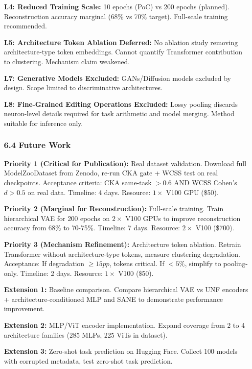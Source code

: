\textbf{L4: Reduced Training Scale:} 10 epochs (PoC) vs 200 epochs (planned). Reconstruction accuracy marginal (68\% vs 70\% target). Full-scale training recommended.

\textbf{L5: Architecture Token Ablation Deferred:} No ablation study removing architecture-type token embeddings. Cannot quantify Transformer contribution to clustering. Mechanism claim weakened.

\textbf{L7: Generative Models Excluded:} GANs/Diffusion models excluded by design. Scope limited to discriminative architectures.

\textbf{L8: Fine-Grained Editing Operations Excluded:} Lossy pooling discards neuron-level details required for task arithmetic and model merging. Method suitable for inference only.

\subsubsection{6.4 Future Work}

\textbf{Priority 1 (Critical for Publication):} Real dataset validation. Download full ModelZooDataset from Zenodo, re-run CKA gate + WCSS test on real checkpoints. Acceptance criteria: CKA same-task $> 0.6$ AND WCSS Cohen's $d > 0.5$ on real data. Timeline: 4 days. Resource: $1\times$ V100 GPU (\$50).

\textbf{Priority 2 (Marginal for Reconstruction):} Full-scale training. Train hierarchical VAE for 200 epochs on $2\times$ V100 GPUs to improve reconstruction accuracy from 68\% to 70-75\%. Timeline: 7 days. Resource: $2\times$ V100 (\$700).

\textbf{Priority 3 (Mechanism Refinement):} Architecture token ablation. Retrain Transformer without architecture-type tokens, measure clustering degradation. Acceptance: If degradation $\geq 15pp$, tokens critical. If $< 5\%$, simplify to pooling-only. Timeline: 2 days. Resource: $1\times$ V100 (\$50).

\textbf{Extension 1:} Baseline comparison. Compare hierarchical VAE vs UNF encoders + architecture-conditioned MLP and SANE to demonstrate performance improvement.

\textbf{Extension 2:} MLP/ViT encoder implementation. Expand coverage from 2 to 4 architecture families (285 MLPs, 225 ViTs in dataset).

\textbf{Extension 3:} Zero-shot task prediction on Hugging Face. Collect 100 models with corrupted metadata, test zero-shot task prediction.

